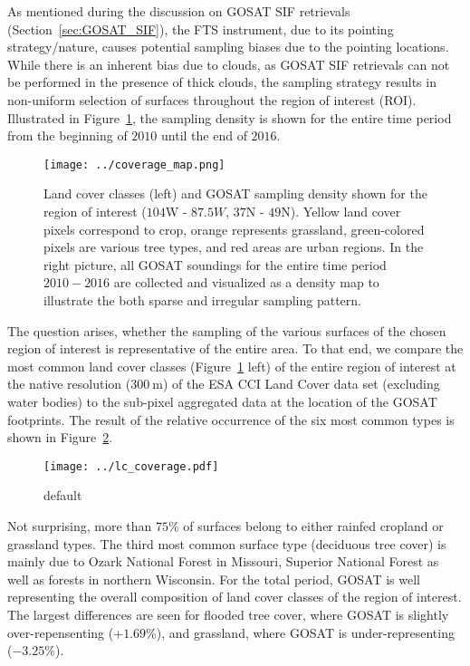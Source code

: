 \documentclass[review, a4paper, 10pt, times]{elsarticle}
\begin{document}
As mentioned during the discussion on GOSAT SIF retrievals (Section~\ref{sec:GOSAT_SIF}), the FTS instrument, due to its pointing strategy/nature, causes potential sampling biases due to the pointing locations. While there is an inherent bias due to clouds, as GOSAT SIF retrievals can not be performed in the presence of thick clouds, the sampling strategy results in non-uniform selection of surfaces throughout the region of interest (ROI). Illustrated in Figure~\ref{fig:sampling}, the sampling density is shown for the entire time period from the beginning of $2010$ until the end of $2016$. 

\begin{figure}[htbp]
\centering
\texttt{[image: ../coverage\_map.png]}
\caption{Land cover classes (left) and GOSAT sampling density shown for the region of interest ($104$W - $87.5W$, $37$N - $49$N). Yellow land cover pixels correspond to crop, orange represents grassland, green-colored pixels are various tree types, and red areas are urban regions. In the right picture, all GOSAT soundings for the entire time period $2010-2016$ are collected and visualized as a density map to illustrate the both sparse and irregular sampling pattern.}
\label{fig:sampling}
\end{figure}

The question arises, whether the sampling of the various surfaces of the chosen region of interest is representative of the entire area. To that end, we compare the most common land cover classes (Figure~\ref{fig:sampling} left) of the entire region of interest at the native resolution ($300\:\mathrm{m}$) of the ESA CCI Land Cover data set (excluding water bodies) to the sub-pixel aggregated data at the location of the GOSAT footprints. The result of the relative occurrence of the six most common types is shown in Figure~\ref{fig:lc_coverage}. 

\begin{figure}[htbp]
\centering
\texttt{[image: ../lc\_coverage.pdf]}
\caption{default}
\label{fig:lc_coverage}
\end{figure}

Not surprising, more than $75\%$ of surfaces belong to either rainfed cropland or grassland types. The third most common surface type (deciduous tree cover) is mainly due to Ozark National Forest in Missouri, Superior National Forest as well as forests in northern Wisconsin. For the total period, GOSAT is well representing the overall composition of land cover classes of the region of interest. The largest differences are seen for flooded tree cover, where GOSAT is slightly over-repensenting ($+1.69\%$), and grassland, where GOSAT is under-representing ($-3.25\%$).
\end{document}
